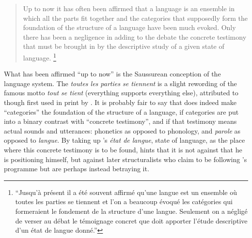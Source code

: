 \documentclass[output=paper]{langscibook}
\begin{document}
\begin{quotation}
Up to now it has often been affirmed that a language is an ensemble in which all the parts fit together and the categories that supposedly form the foundation of the structure of a language have been much evoked. Only there has been a negligence in adding to the debate the concrete testimony that must be brought in by the descriptive study of a given state of language. \citep[7]{Sauvageot1946}\footnote{``Jusqu'à présent il a été souvent affirmé qu'une langue est un ensemble où toutes les parties se tiennent et l'on a beaucoup évoqué les catégories qui formeraient le fondement de la structure d'une langue. Seulement on a négligé de verser au débat le témoignage concret que doit apporter l'étude descriptive d'un état de langue donné.''}
\end{quotation}

What has been affirmed ``up to now'' is the Saussurean conception of the language system. The \emph{toutes les parties se tiennent} is a slight rewording of the famous motto \emph{tout se tient} (everything supports everything else), attributed to {\Saussure} though first used in print by \citet[407]{Meillet1903}. It is probably fair to say that  does indeed make ``categories'' the foundation of the structure of a language, if categories are put into a binary contrast with ``concrete testimony'', and if that testimony means actual sounds and utterances: phonetics as opposed to phonology, and \emph{parole} as opposed to \emph{langue}. By taking up {\Saussure}'s \emph{état de langue}, state of language, as the place where this concrete testimony is to be found, {\Sauvageot} hints that it is not against {\Saussure} that he is positioning himself, but against later structuralists who claim to be following {\Saussure}'s programme but are perhaps instead betraying it.
\end{document}
